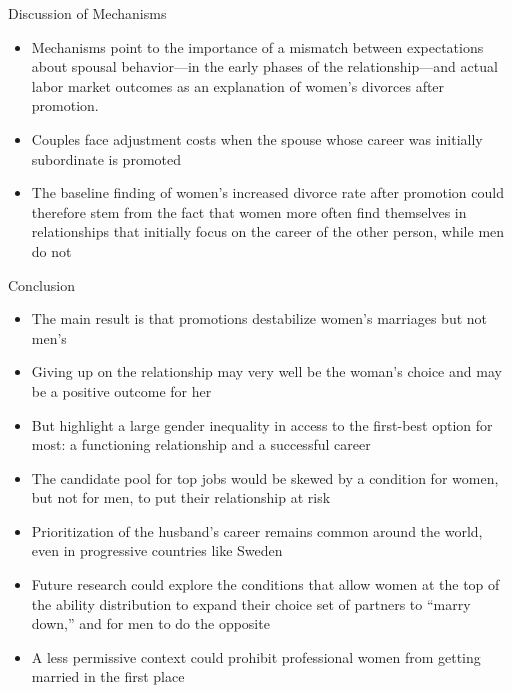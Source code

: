 \documentclass[11pt,notes=hide,aspectratio=169,mathserif]{beamer}
\begin{document}
\begin{frame}{Discussion of Mechanisms}
\small
\begin{itemize}
  \item Mechanisms point to the importance of a mismatch
  between expectations  about spousal behavior—in the early phases of the
  relationship—and  actual labor market outcomes as an explanation of women’s
  divorces after promotion.
  \item Couples face adjustment costs when the spouse whose
  career was initially subordinate is promoted
  \item The baseline finding of women’s increased divorce rate after promotion could therefore stem
  from the fact that women more often find themselves in relationships that initially
  focus on the career of the other person, while men do not
\end{itemize}
\end{frame}

\begin{frame}{Conclusion}
\small
\begin{itemize}
  \item The main result is that promotions destabilize women’s
  marriages but not men’s
  \item  Giving up on the relationship may
  very well be the woman’s choice and may be a positive outcome for her
  \item But highlight a large gender inequality in access to the first-best option for
  most: a functioning relationship and a successful career
  \item The candidate pool for top jobs would be skewed by a condition for women,
  but not for men, to put their relationship at risk
  \item Prioritization
  of the husband’s career remains common around the world, even in progressive
  countries like Sweden
  \item Future research could explore the conditions that allow
  women at the top of the ability distribution to expand their choice set of partners to
  “marry down,” and for men to do the opposite
  \item A less permissive context
  could prohibit  professional women from getting married in the first place
\end{itemize}
\end{frame}
\end{document}
